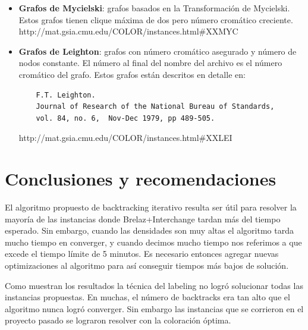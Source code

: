 \documentclass[a4paper,10pt]{article}
\begin{document}
\begin{itemize}
 \item \textbf{Grafos de Mycielski}: grafos basados en la
       Transformaci\'on de Mycielski. Estos grafos tienen clique
       m\'axima de dos pero n\'umero crom\'atico creciente.\\
       http://mat.gsia.cmu.edu/COLOR/instances.html#XXMYC
 \item \textbf{Grafos de Leighton}: grafos con n\'umero crom\'atico
       asegurado y n\'umero de nodos constante. El n\'umero al final del
       nombre del archivo es el n\'umero crom\'atico del grafo. Estos
       grafos est\'an descritos en detalle en:
       \begin{verbatim}
	F.T. Leighton.	
	Journal of Research of the National Bureau of Standards,  
	vol. 84, no. 6,  Nov-Dec 1979, pp 489-505.
       \end{verbatim}
       http://mat.gsia.cmu.edu/COLOR/instances.html#XXLEI
\end{itemize}


\newpage

\section{Conclusiones y recomendaciones}
El algoritmo propuesto de backtracking iterativo resulta ser 
útil para resolver la mayoría de las instancias donde Brelaz+Interchange 
tardan más del tiempo esperado. Sin embargo, cuando las densidades son muy altas 
el algoritmo tarda mucho tiempo en converger, y cuando decimos mucho tiempo nos referimos 
a que excede el tiempo límite de 5 minutos. Es necesario entonces agregar nuevas optimizaciones 
al algoritmo para así conseguir tiempos más bajos de solución. 

Como muestran los resultados la técnica del labeling no logró solucionar todas las instancias
propuestas. En muchas, el número de backtracks era tan alto que el algoritmo 
nunca logró converger. Sin embargo las instancias que se corrieron en el proyecto 
pasado se lograron resolver con la coloración óptima.
\end{document}
